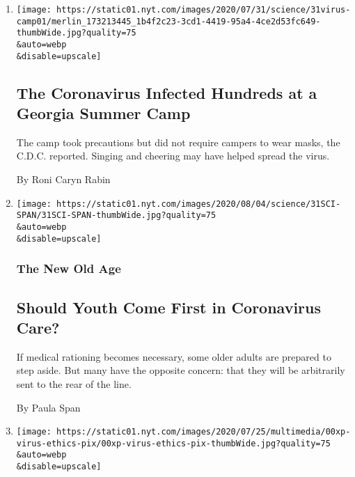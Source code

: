 \begin{enumerate}
\def\labelenumi{\arabic{enumi}.}
\item
  \href{/2020/07/31/health/coronavirus-children-camp.html}{}

  \texttt{[image: https://static01.nyt.com/images/2020/07/31/science/31virus-camp01/merlin\_173213445\_1b4f2c23-3cd1-4419-95a4-4ce2d53fc649-thumbWide.jpg?quality=75\\\&auto=webp\\\&disable=upscale]}

  \hypertarget{the-coronavirus-infected-hundreds-at-a-georgia-summer-camp}{%
  \subsection{The Coronavirus Infected Hundreds at a Georgia Summer
  Camp}\label{the-coronavirus-infected-hundreds-at-a-georgia-summer-camp}}

  The camp took precautions but did not require campers to wear masks,
  the C.D.C. reported. Singing and cheering may have helped spread the
  virus.

  By Roni Caryn Rabin
\item
  \href{/2020/07/31/health/coronavirus-ethics-rationing-elderly.html}{}

  \texttt{[image: https://static01.nyt.com/images/2020/08/04/science/31SCI-SPAN/31SCI-SPAN-thumbWide.jpg?quality=75\\\&auto=webp\\\&disable=upscale]}

  \hypertarget{the-new-old-age}{%
  \subsubsection{The New Old Age}\label{the-new-old-age}}

  \hypertarget{should-youth-come-first-in-coronavirus-care}{%
  \subsection{Should Youth Come First in Coronavirus
  Care?}\label{should-youth-come-first-in-coronavirus-care}}

  If medical rationing becomes necessary, some older adults are prepared
  to step aside. But many have the opposite concern: that they will be
  arbitrarily sent to the rear of the line.

  By Paula Span
\item
  \href{/2020/07/31/health/coronavirus-covid-testing.html}{}

  \texttt{[image: https://static01.nyt.com/images/2020/07/25/multimedia/00xp-virus-ethics-pix/00xp-virus-ethics-pix-thumbWide.jpg?quality=75\\\&auto=webp\\\&disable=upscale]}


\end{enumerate}
